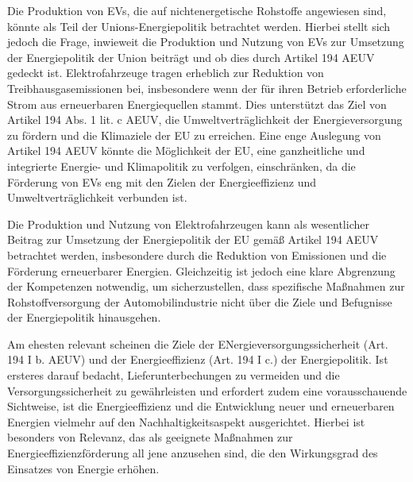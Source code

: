 \documentclass[12pt,a4paper,oneside]{book} %
\begin{document}
Die Produktion von EVs, die auf nichtenergetische Rohstoffe angewiesen sind, könnte als Teil der Unions-Energiepolitik betrachtet werden. Hierbei stellt sich jedoch die Frage, inwieweit die Produktion und Nutzung von EVs zur Umsetzung der Energiepolitik der Union beiträgt und ob dies durch Artikel 194 AEUV gedeckt ist. Elektrofahrzeuge tragen erheblich zur Reduktion von Treibhausgasemissionen bei, insbesondere wenn der für ihren Betrieb erforderliche Strom aus erneuerbaren Energiequellen stammt. Dies unterstützt das Ziel von Artikel 194 Abs. 1 lit. c AEUV, die Umweltverträglichkeit der Energieversorgung zu fördern und die Klimaziele der EU zu erreichen. Eine enge Auslegung von Artikel 194 AEUV könnte die Möglichkeit der EU, eine ganzheitliche und integrierte Energie- und Klimapolitik zu verfolgen, einschränken, da die Förderung von EVs eng mit den Zielen der Energieeffizienz und Umweltverträglichkeit verbunden ist.

Die Produktion und Nutzung von Elektrofahrzeugen kann als wesentlicher Beitrag zur Umsetzung der Energiepolitik der EU gemäß Artikel 194 AEUV betrachtet werden, insbesondere durch die Reduktion von Emissionen und die Förderung erneuerbarer Energien. Gleichzeitig ist jedoch eine klare Abgrenzung der Kompetenzen notwendig, um sicherzustellen, dass spezifische Maßnahmen zur Rohstoffversorgung der Automobilindustrie nicht über die Ziele und Befugnisse der Energiepolitik hinausgehen.
	
Am ehesten relevant scheinen die Ziele der ENergieversorgungssicherheit (Art. 194 I b. AEUV) und der Energieeffizienz (Art. 194 I c.) der Energiepolitik. Ist ersteres darauf bedacht, Lieferunterbechungen zu vermeiden und die Versorgungssicherheit zu gewährleisten\autocite[Nettesheim, Art. 194 Rn 16]{grabitz_recht_2024} und erfordert zudem eine vorausschauende Sichtweise\autocite[631]{umbach_europaische_2005}, ist die Energieeffizienz und die Entwicklung neuer und erneuerbaren Energien vielmehr auf den Nachhaltigkeitsaspekt ausgerichtet.\autocite[Nettesheim, Art. 194 Rn 17]{grabitz_recht_2024} Hierbei ist besonders von Relevanz, das als geeignete Maßnahmen zur Energieeffizienzförderung all jene anzusehen sind, die den Wirkungsgrad des Einsatzes von Energie erhöhen.\autocite[Nettesheim, Art. 194 Rn 16]{grabitz_recht_2024}
	
\end{document}

